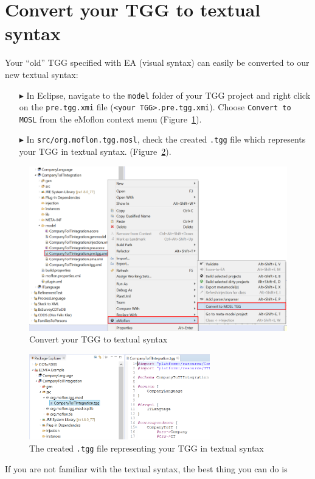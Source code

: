 \newpage

\section{Convert your TGG to textual syntax}
\genHeader

Your ``old'' TGG specified with EA (visual syntax) can easily be
converted to our new textual syntax:

\begin{enumerate}

\item[$\blacktriangleright$] In Eclipse, navigate to the \texttt{model} folder
of your TGG project and right click on the \texttt{pre.tgg.xmi} file
(\texttt{<your TGG>.pre.tgg.xmi}).
Choose \texttt{Convert to MOSL} from the eMoflon context menu
(Figure~\ref{fig:convertToMOSL}).


\item[$\blacktriangleright$] In \texttt{src/org.moflon.tgg.mosl}, check the
created \texttt{.tgg} file which represents your TGG in textual syntax.
(Figure~\ref{fig:tggfile}).
\end{enumerate}

\begin{figure}[h]
\begin{center}
 	\includegraphics[width=\textwidth]{convertToMOSL}
	\caption{Convert your TGG to textual syntax}
  	\label{fig:convertToMOSL}
\end{center}

\end{figure}
\begin{figure}[h]
\begin{center}
 	\includegraphics[width=0.7\textwidth]{tggfile}
	\caption{The created \texttt{.tgg} file representing your TGG in textual
	syntax}
  	\label{fig:tggfile}
\end{center}
\end{figure}

If you are not familiar with the textual syntax, the best thing you can do is 